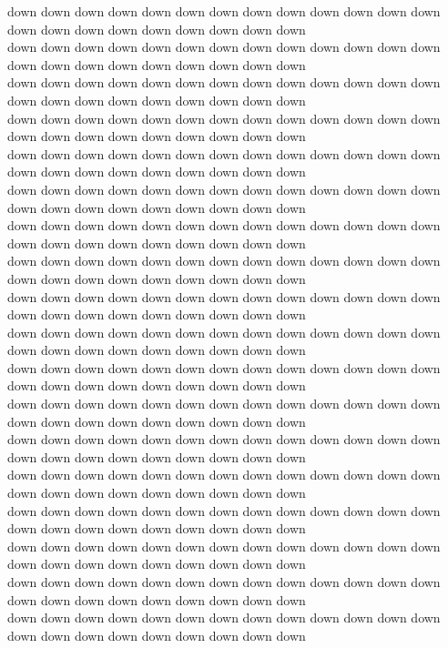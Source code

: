 down down down down down down down down down down down down down down down down down down down down down down\\
down down down down down down down down down down down down down down down down down down down down down down\\
down down down down down down down down down down down down down down down down down down down down down down\\
down down down down down down down down down down down down down down down down down down down down down down\\
down down down down down down down down down down down down down down down down down down down down down down\\
down down down down down down down down down down down down down down down down down down down down down down\\
down down down down down down down down down down down down down down down down down down down down down down\\
down down down down down down down down down down down down down down down down down down down down down down\\
down down down down down down down down down down down down down down down down down down down down down down\\
down down down down down down down down down down down down down down down down down down down down down down\\
down down down down down down down down down down down down down down down down down down down down down down\\
down down down down down down down down down down down down down down down down down down down down down down\\
down down down down down down down down down down down down down down down down down down down down down down\\
down down down down down down down down down down down down down down down down down down down down down down\\
down down down down down down down down down down down down down down down down down down down down down down\\
down down down down down down down down down down down down down down down down down down down down down down\\
down down down down down down down down down down down down down down down down down down down down down down\\
down down down down down down down down down down down down down down down down down down down down down down\\
